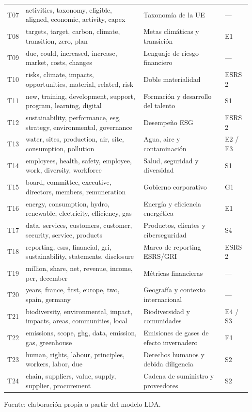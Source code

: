 \begin{longtable}{p{0.8cm}p{6.4cm}p{4.6cm}p{1.4cm}}
T07 & activities, taxonomy, eligible, aligned, economic, activity, capex & Taxonomía de la UE & --- \\
T08 & targets, target, carbon, climate, transition, zero, plan & Metas climáticas y transición & E1 \\
T09 & due, could, increased, increase, market, costs, changes & Lenguaje de riesgo financiero & --- \\
T10 & risks, climate, impacts, opportunities, material, related, risk & Doble materialidad & ESRS 2 \\
T11 & new, training, development, support, program, learning, digital & Formación y desarrollo del talento & S1 \\
T12 & sustainability, performance, esg, strategy, environmental, governance & Desempeño ESG & ESRS 2 \\
T13 & water, sites, production, air, site, consumption, pollution & Agua, aire y contaminación & E2 / E3 \\
T14 & employees, health, safety, employee, work, diversity, workforce & Salud, seguridad y diversidad & S1 \\
T15 & board, committee, executive, directors, members, remuneration & Gobierno corporativo & G1 \\
T16 & energy, consumption, hydro, renewable, electricity, efficiency, gas & Energía y eficiencia energética & E1 \\
T17 & data, services, customers, customer, security, service, products & Productos, clientes y ciberseguridad & S4 \\
T18 & reporting, esrs, financial, gri, sustainability, statements, disclosure & Marco de reporting ESRS/GRI & ESRS 2 \\
T19 & million, share, net, revenue, income, per, december & Métricas financieras & --- \\
T20 & years, france, first, europe, two, spain, germany & Geografía y contexto internacional & --- \\
T21 & biodiversity, environmental, impact, impacts, areas, communities, local & Biodiversidad y comunidades & E4 / S3 \\
T22 & emissions, scope, ghg, data, emission, gas, greenhouse & Emisiones de gases de efecto invernadero & E1 \\
T23 & human, rights, labour, principles, workers, labor, due & Derechos humanos y debida diligencia & S2 \\
T24 & chain, suppliers, value, supply, supplier, procurement & Cadena de suministro y proveedores & S2 \\
\end{longtable}
{\footnotesize Fuente: elaboración propia a partir del modelo LDA.}

